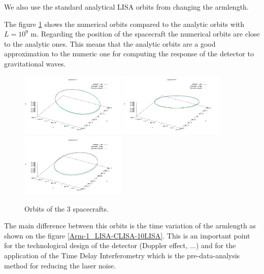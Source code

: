 \documentclass{iopart}
\begin{document}
We also use the standard analytical LISA orbits from \cite{dhu05} changing the armlength.

The figure \ref{F:OrbSC} shows the numerical orbits compared to the analytic orbits with $L = 10^9$ m.
Regarding the position of the spacecraft the numerical orbits are close to the analytic ones. This means that the analytic orbits are a good approximation to the numeric one for computing the response of the detector to gravitational waves.

\begin{figure}[H]
\begin{center}
\includegraphics[width=0.45\textwidth]{FigNoiseOrbSens/Orb_SC1_LISA-CLISA-10LISA}
\includegraphics[width=0.45\textwidth]{FigNoiseOrbSens/Orb_SC2_LISA-CLISA-10LISA}
\includegraphics[width=0.45\textwidth]{FigNoiseOrbSens/Orb_SC3_LISA-CLISA-10LISA} 
\end{center}
\caption{Orbits of the 3 spacecrafts.
\label{F:OrbSC} } 
\end{figure}

The main difference between this orbits is the time variation of the armlength as shown on the figure \ref{Arm-1_LISA-CLISA-10LISA}.
This is an important point for the technological design of the detector (Doppler effect, ...) and for the application of the Time Delay Interferometry which is the pre-data-analysis method for reducing the laser noise. 
\end{document}
